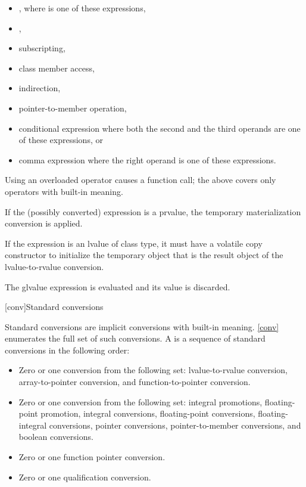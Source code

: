 \begin{itemize}
\item \tcode{(}  \tcode{)}, where
   is one of these expressions,
\item {},
\item subscripting,
\item class member access,
\item indirection,
\item pointer-to-member operation,
\item conditional expression where both the second and the
      third operands are one of these expressions, or
\item comma expression where the right operand is one of
      these expressions.
\end{itemize}

\begin{note}
Using an overloaded operator causes a function call; the
above covers only operators with built-in meaning.
\end{note}
If the (possibly converted) expression is a prvalue,
the temporary materialization conversion is applied.
\begin{note}
If the expression is an lvalue of
class type, it must have a volatile copy constructor to initialize the
temporary object that is the result object of the lvalue-to-rvalue
conversion.
\end{note}
The glvalue expression is evaluated and its value is discarded.

[conv]{Standard conversions}

%

\pnum
{}%
%
Standard conversions are implicit conversions with built-in meaning.
\ref{conv} enumerates the full set of such conversions. A
 is a sequence of standard
conversions in the following order:

\begin{itemize}
\item Zero or one conversion from the following set: lvalue-to-rvalue
conversion, array-to-pointer conversion, and function-to-pointer
conversion.

\item Zero or one conversion from the following set: integral
promotions, floating-point promotion, integral conversions, floating-point
conversions, floating-integral conversions, pointer conversions,
pointer-to-member conversions, and boolean conversions.

\item Zero or one function pointer conversion.

\item Zero or one qualification conversion.
\end{itemize}

